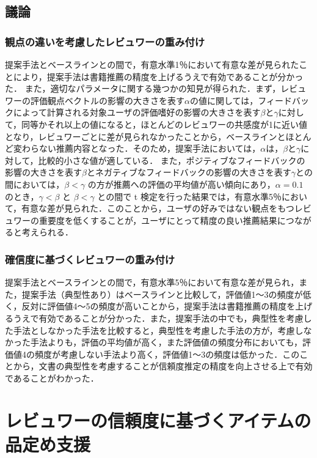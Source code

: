 \documentclass[a4paper,11pt,oneside,openany]{jsbook}
\begin{document}
	\section{議論}
	\subsection{観点の違いを考慮したレビュワーの重み付け}
提案手法とベースラインとの間で，有意水準1％において有意な差が見られたことにより，提案手法は書籍推薦の精度を上げるうえで有効であることが分かった．
また，適切なパラメータに関する幾つかの知見が得られた．まず，レビュワーの評価観点ベクトルの影響の大きさを表す$\alpha$の値に関しては，フィードバックによって計算される対象ユーザの評価嗜好の影響の大きさを表す$\beta$と$\gamma$に対して，同等かそれ以上の値になると，ほとんどのレビュワーの共感度が1に近い値となり，レビュワーごとに差が見られなかったことから，ベースラインとほとんど変わらない推薦内容となった．そのため，提案手法においては，$\alpha$は，$\beta$と$\gamma$に対して，比較的小さな値が適している．
また，ポジティブなフィードバックの影響の大きさを表す$\beta$とネガティブなフィードバックの影響の大きさを表す$\gamma$との間においては，$\beta < \gamma$ の方が推薦への評価の平均値が高い傾向にあり，$\alpha = 0.1$ のとき，$\gamma < \beta$ と $\beta < \gamma$ との間で t 検定を行った結果では，有意水準5％において，有意な差が見られた．このことから，ユーザの好みではない観点をもつレビュワーの重要度を低くすることが，ユーザにとって精度の良い推薦結果につながると考えられる．

	\subsection{確信度に基づくレビュワーの重み付け}
提案手法とベースラインとの間で，有意水準5％において有意な差が見られ，また，提案手法（典型性あり）はベースラインと比較して，評価値1〜3の頻度が低く，反対に評価値4〜5の頻度が高いことから，提案手法は書籍推薦の精度を上げるうえで有効であることが分かった．また，提案手法の中でも，典型性を考慮した手法としなかった手法を比較すると，典型性を考慮した手法の方が，考慮しなかった手法よりも，評価の平均値が高く，また評価値の頻度分布においても，評価値4の頻度が考慮しない手法より高く，評価値1〜3の頻度は低かった．このことから，文書の典型性を考慮することが信頼度推定の精度を向上させる上で有効であることがわかった．


\chapter{レビュワーの信頼度に基づくアイテムの品定め支援}
\end{document}

